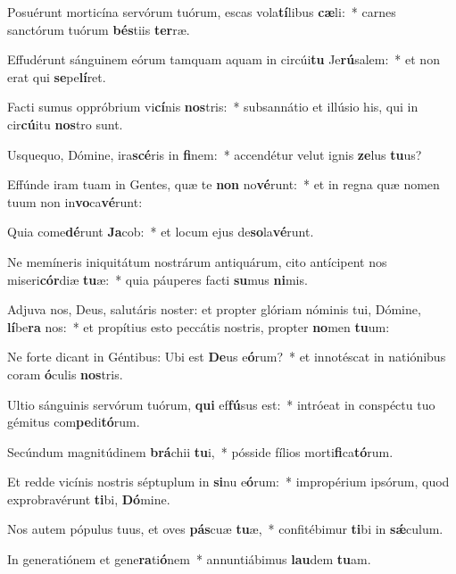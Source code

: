 \item Posuérunt morticína servórum tuórum, escas vola\textbf{tí}libus \textbf{cæ}li:~* carnes sanctórum tuórum \textbf{bés}tiis \textbf{ter}ræ.
\item Effudérunt sánguinem eórum tamquam aquam in circúi\textbf{tu} Je\textbf{rú}salem:~* et non erat qui \textbf{se}pe\textbf{lí}ret.
\item Facti sumus oppróbrium vi\textbf{cí}nis \textbf{nos}tris:~* subsannátio et illúsio his, qui in cir\textbf{cú}itu \textbf{nos}tro sunt.
\item Usquequo, Dómine, ira\textbf{scé}ris in \textbf{fi}nem:~* accendétur velut ignis \textbf{ze}lus \textbf{tu}us?
\item Effúnde iram tuam in Gentes, quæ te \textbf{non} no\textbf{vé}runt:~* et in regna quæ nomen tuum non in\textbf{vo}ca\textbf{vé}runt:
\item Quia come\textbf{dé}runt \textbf{Ja}cob:~* et locum ejus de\textbf{so}la\textbf{vé}runt.
\item Ne memíneris iniquitátum nostrárum antiquárum, cito antícipent nos miseri\textbf{cór}diæ \textbf{tu}æ:~* quia páuperes facti \textbf{su}mus \textbf{ni}mis.
\item Adjuva nos, Deus, salutáris noster: et propter glóriam nóminis tui, Dómine, \textbf{lí}be\textbf{ra} nos:~* et propítius esto peccátis nostris, propter \textbf{no}men \textbf{tu}um:
\item Ne forte dicant in Géntibus: Ubi est \textbf{De}us e\textbf{ó}rum?~* et innotéscat in natiónibus coram \textbf{ó}culis \textbf{nos}tris.
\item Ultio sánguinis servórum tuórum, \textbf{qui} ef\textbf{fú}sus est:~* intróeat in conspéctu tuo gémitus com\textbf{pe}di\textbf{tó}rum.
\item Secúndum magnitúdinem \textbf{brá}chii \textbf{tu}i,~* pósside fílios morti\textbf{fi}ca\textbf{tó}rum.
\item Et redde vicínis nostris séptuplum in \textbf{si}nu e\textbf{ó}rum:~* impropérium ipsórum, quod exprobravérunt \textbf{ti}bi, \textbf{Dó}mine.
\item Nos autem pópulus tuus, et oves \textbf{pás}cuæ \textbf{tu}æ,~* confitébimur \textbf{ti}bi in \textbf{sǽ}culum.
\item In generatiónem et gene\textbf{ra}ti\textbf{ó}nem~* annuntiábimus \textbf{lau}dem \textbf{tu}am.
